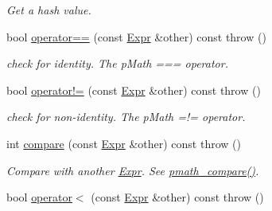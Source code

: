 \begin{CompactItemize}
\begin{CompactList}\small\item\em Get a hash value. \item\end{CompactList}\item 
\hypertarget{classpmath_1_1_expr_4400c28fc40ae423095d71ba694cd0de}{
bool \hyperlink{classpmath_1_1_expr_4400c28fc40ae423095d71ba694cd0de}{operator==} (const \hyperlink{classpmath_1_1_expr}{Expr} \&other) const   throw ()}
\label{classpmath_1_1_expr_4400c28fc40ae423095d71ba694cd0de}

\begin{CompactList}\small\item\em check for identity. The pMath === operator. \item\end{CompactList}\item 
\hypertarget{classpmath_1_1_expr_783a0634b0f7607a19ac6b14abe11fa5}{
bool \hyperlink{classpmath_1_1_expr_783a0634b0f7607a19ac6b14abe11fa5}{operator!=} (const \hyperlink{classpmath_1_1_expr}{Expr} \&other) const   throw ()}
\label{classpmath_1_1_expr_783a0634b0f7607a19ac6b14abe11fa5}

\begin{CompactList}\small\item\em check for non-identity. The pMath =!= operator. \item\end{CompactList}\item 
\hypertarget{classpmath_1_1_expr_6331d6d841117e3bdc509538b101fa26}{
int \hyperlink{classpmath_1_1_expr_6331d6d841117e3bdc509538b101fa26}{compare} (const \hyperlink{classpmath_1_1_expr}{Expr} \&other) const   throw ()}
\label{classpmath_1_1_expr_6331d6d841117e3bdc509538b101fa26}

\begin{CompactList}\small\item\em Compare with another \hyperlink{classpmath_1_1_expr}{Expr}. See \hyperlink{group__objects_gc57589e08f5b3eed28e724c646503735}{pmath\_\-compare()}. \item\end{CompactList}\item 
\hypertarget{classpmath_1_1_expr_260d8f5a63719b82571318ca1d4b2963}{
bool \hyperlink{classpmath_1_1_expr_260d8f5a63719b82571318ca1d4b2963}{operator$<$} (const \hyperlink{classpmath_1_1_expr}{Expr} \&other) const   throw ()}
\label{classpmath_1_1_expr_260d8f5a63719b82571318ca1d4b2963}


\end{CompactItemize}
